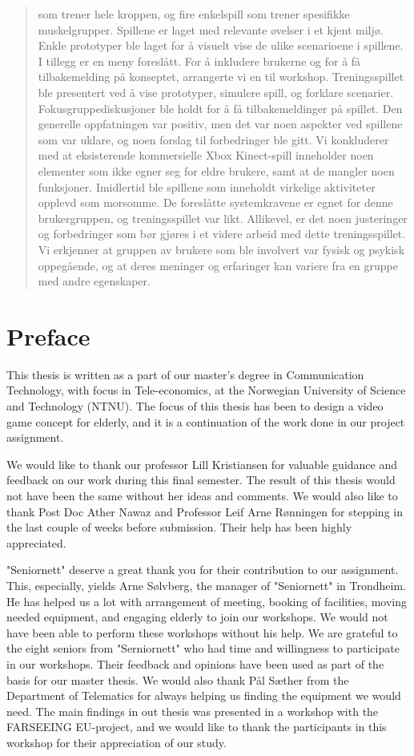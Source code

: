 \documentclass[b5paper,twoside,openright,11pt]{report}
\begin{document}
\begin{abstract}
som trener hele kroppen, og fire enkelspill som trener spesifikke muskelgrupper. Spillene er laget med relevante øvelser i et kjent miljø. Enkle prototyper ble laget for å visuelt vise de ulike scenarioene i spillene. I tillegg er en meny foreslått. For å inkludere brukerne og for å få tilbakemelding på konseptet, arrangerte vi en til workshop. Treningsspillet ble presentert ved å vise prototyper, simulere spill, og forklare scenarier. Fokusgruppediskusjoner ble holdt for å få tilbakemeldinger på spillet. Den generelle oppfatningen var positiv, men det var noen aspekter ved spillene som var uklare, og noen forslag til forbedringer ble gitt. Vi konkluderer med at eksisterende kommersielle Xbox Kinect-spill inneholder noen elementer som ikke egner seg for eldre brukere, samt at de mangler noen funksjoner. Imidlertid ble spillene som inneholdt virkelige aktiviteter opplevd som morsomme. De foreslåtte systemkravene er egnet for denne brukergruppen, og treningsspillet var likt. Allikevel, er det noen justeringer og forbedringer som bør gjøres i et videre arbeid med dette treningsspillet. Vi erkjenner at gruppen av brukere som ble involvert var fysisk og psykisk oppegående, og at deres meninger og erfaringer kan variere fra en gruppe med andre egenskaper. 
\end{abstract}
\cleardoublepage
\chapter*{Preface}
This thesis is written as a part of our master's degree in Communication Technology, with focus in Tele-economics, at the Norwegian University of Science and Technology (NTNU). The focus of this thesis has been to design a video game concept for elderly, and it is a continuation of the work done in our project assignment. 

We would like to thank our professor Lill Kristiansen for valuable guidance and feedback on our work during this final semester. The result of this thesis would not have been the same without her ideas and comments. We would also like to thank Post Doc Ather Nawaz and Professor Leif Arne Rønningen for stepping in the last couple of weeks before submission. Their help has been highly appreciated.  

"Seniornett" deserve a great thank you for their contribution to our assignment. This, especially, yields Arne Sølvberg, the manager of "Seniornett" in Trondheim. He has helped us a lot with arrangement of meeting, booking of facilities, moving needed equipment, and engaging elderly to join our workshops. We would not have been able to perform these workshops without his help. We are grateful to the eight seniors from "Serniornett" who had time and willingness to participate in our workshops. Their feedback and opinions have been used as part of the basis for our master thesis. We would also thank Pål Sæther from the Department of Telematics for always helping us finding the equipment we would need. The main findings in out thesis was presented in a workshop with the FARSEEING EU-project, and we would like to thank the participants in this workshop for their appreciation of our study. 
\end{document}

